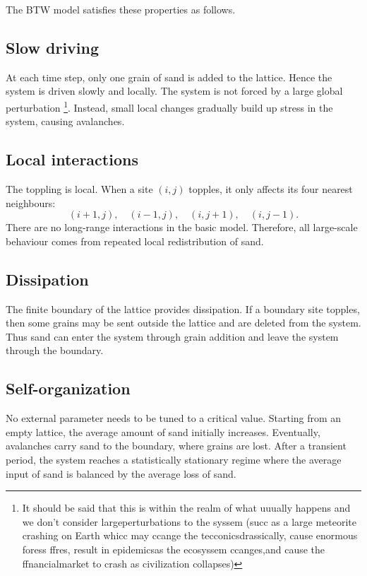The BTW model satisfies these properties as follows.

\subsection*{Slow driving}

At each time step, only one grain of sand is added to the lattice. Hence the system is driven slowly and locally. The system is not forced by a large global perturbation \footnote{It should be said that this is within the realm of what uuually happens and we don’t consider largeperturbations to the syssem (succ as a large meteorite crashing on Earth whicc may ccange the tecconicsdrassically, cause enormous foress ffres, result in epidemicsas the ecosyssem ccanges,and cause the ffnancialmarket to crash as civilization collapses)}. Instead, small local changes gradually build up stress in the system, causing avalanches.

\subsection*{Local interactions}

The toppling is local. When a site $(i,j)$ topples, it only affects its four nearest neighbours:
\[
    (i+1,j),\quad (i-1,j),\quad (i,j+1),\quad (i,j-1).
\]
There are no long-range interactions in the basic model. Therefore, all large-scale behaviour comes from repeated local redistribution of sand.

\subsection*{Dissipation}

The finite boundary of the lattice provides dissipation. If a boundary site topples, then some grains may be sent outside the lattice and are deleted from the system. Thus sand can enter the system through grain addition and leave the system through the boundary.

\subsection*{Self-organization}

No external parameter needs to be tuned to a critical value. Starting from an empty lattice, the average amount of sand initially increases. Eventually, avalanches carry sand to the boundary, where grains are lost. After a transient period, the system reaches a statistically stationary regime where the average input of sand is balanced by the average loss of sand.

